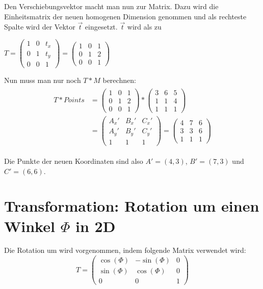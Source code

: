 Den Verschiebungsvektor macht man nun zur Matrix. Dazu wird die Einheitsmatrix der neuen homogenen Dimension genommen und als rechteste Spalte wird der Vektor $\vec{t}$ eingesetzt. $\vec{t}$ wird als zu 

$T=\begin{pmatrix}
1 & 0 & t_x\\
0 & 1 & t_y\\
0 & 0 & 1
\end{pmatrix}=\begin{pmatrix}
1 & 0 & 1\\
0 & 1 & 2\\
0 & 0 & 1
\end{pmatrix}$

Nun muss man nur noch $T * M$ berechnen:
\begin{align}
\begin{split}
T*Points &=\begin{pmatrix}
1 & 0 & 1\\
0 & 1 & 2\\
0 & 0 & 1
\end{pmatrix} * \begin{pmatrix}
3 & 6 & 5\\
1 & 1 & 4\\
1 & 1 & 1
\end{pmatrix}\\
&= \begin{pmatrix}
A_x' & B_x' & C_x'\\
A_y' & B_y' & C_y'\\ \hline
1 & 1 & 1
\end{pmatrix} = \begin{pmatrix}
4 & 7 & 6\\
3 & 3 & 6\\ \hline
1 & 1 & 1
\end{pmatrix}
\end{split}
\end{align}

Die Punkte der neuen Koordinaten sind also $A'=(4,3)$, $B'=(7,3)$ und $C'=(6,6)$.

\section{Transformation: Rotation um einen Winkel $\Phi$ in 2D}

Die Rotation um wird vorgenommen, indem folgende Matrix verwendet wird:
\[
T = \begin{pmatrix}
\cos (\Phi) & -\sin (\Phi) & 0\\
\sin (\Phi) & \cos (\Phi) & 0\\
0 & 0 & 1
\end{pmatrix}
\]

